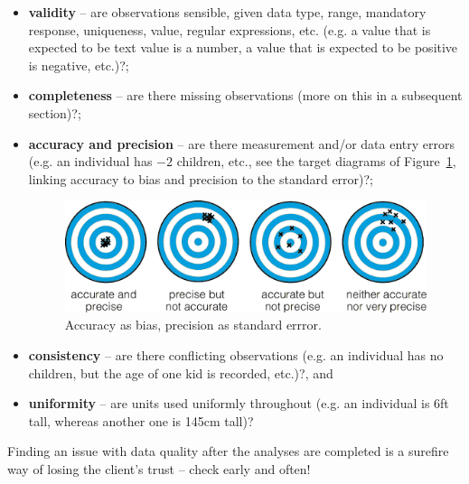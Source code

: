 \begin{itemize}[noitemsep]
\item \textbf{validity} -- are observations sensible, given data type, range, mandatory response, uniqueness, value, regular expressions, etc. (e.g. a value that is expected to be text value is a number, a value that is expected to be positive is negative, etc.)?; 
\item \textbf{completeness} -- are there missing observations (more on this in a subsequent section)?; 
\item \textbf{accuracy and precision} -- are there measurement and/or data entry errors (e.g. an individual has $-2$ children, etc., see the target diagrams of Figure~\ref{fig:targets}, linking accuracy to bias and precision to the standard error)?; \begin{figure}[t]
\centering
\includegraphics[width=\textwidth]{images/DP/targets.png}
\caption{\small Accuracy as bias, precision as standard errror.} \label{fig:targets}
\end{figure}
\afterpage{\FloatBarrier}
\item 
\textbf{consistency} -- are there conflicting observations (e.g. an individual has no children, but the age of one kid is recorded, etc.)?, and 
\item \textbf{uniformity} -- are units used uniformly throughout (e.g. an individual is 6ft tall, whereas another one is 145cm tall)?\end{itemize}
Finding an issue with data quality after the analyses are completed is a surefire way of losing the client's trust -- check early and often!
